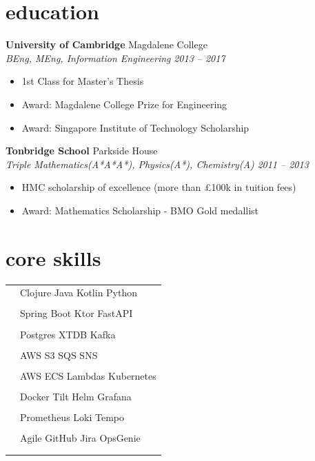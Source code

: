 \documentclass[12pt]{article}
\newcommand{\entry}[4]{{{\textbf{#1}}} \hfill #3 \\ #2 \hfill #4}
\newcommand{\tableentry}[3]{\textsc{#1} & #2\expandafter\ifstrequal\expandafter{#3}{}{\\}{\\[6pt]}}
\begin{document}
    \begin{paracol}{2}

        \section{education}

        \entry{University of Cambridge}{\textit{BEng, MEng, Information Engineering}}{Magdalene College}{\textit{2013 -- 2017}}
        \begin{itemize}[noitemsep,leftmargin=5mm,rightmargin=0mm,topsep=0pt]
            \item 1st Class for Master's Thesis
            \item Award: Magdalene College Prize for Engineering
            \item Award: Singapore Institute of Technology Scholarship
        \end{itemize}

        \smallskip
        \entry{Tonbridge School}{\textit{Triple Mathematics(A*A*A*), Physics(A*), Chemistry(A)}}{Parkside House}{\textit{2011 -- 2013}}
        \begin{itemize}[noitemsep,leftmargin=5mm,rightmargin=0mm,topsep=0pt]
            \item HMC scholarship of excellence (more than £100k in tuition fees)
            \item Award: Mathematics Scholarship - BMO Gold medallist
        \end{itemize}
        \switchcolumn

        \section{core skills}
        \bigskip
        \begin{flushleft}
            \begin{supertabular}{rl}
                \tableentry{\footnotesize\faCode}{Clojure \textperiodcentered{} Java \textperiodcentered{} Kotlin \textperiodcentered{} Python }{}
                \tableentry{}{Spring Boot \textperiodcentered{} Ktor \textperiodcentered{} FastAPI}{}
                \tableentry{\footnotesize\faDatabase \hspace{0.7mm}}{Postgres \textperiodcentered{} XTDB \textperiodcentered{} Kafka}{}
                \tableentry{}{AWS S3 \textperiodcentered{} SQS \textperiodcentered{} SNS}{}

                \tableentry{\footnotesize\faDocker}{AWS ECS \textperiodcentered{} Lambdas \textperiodcentered{} Kubernetes}{}
                \tableentry{}{Docker  \textperiodcentered{} Tilt \textperiodcentered{} Helm  \textperiodcentered{} Grafana}{}
                \tableentry{}{Prometheus \textperiodcentered{} Loki \textperiodcentered{} Tempo }{}
                \tableentry{\footnotesize\faAtlassian}{Agile \textperiodcentered{} GitHub \textperiodcentered{} Jira \textperiodcentered{} OpsGenie}{}
            \end{supertabular}
        \end{flushleft}
    \end{paracol}
\end{document}
